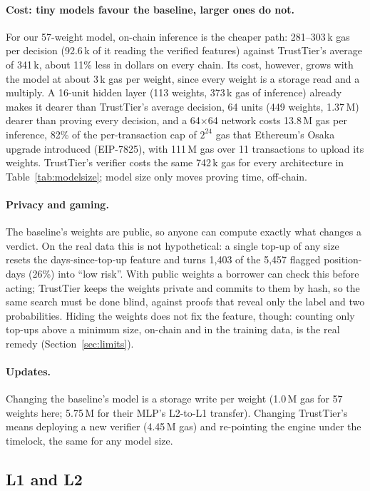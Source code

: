 \documentclass[sigconf,nonacm]{acmart}
\begin{document}
\paragraph{Cost: tiny models favour the baseline, larger ones do not.} For our 57-weight model, on-chain inference is the cheaper path: 281--303\,k gas per decision (92.6\,k of it reading the verified features) against TrustTier's average of 341\,k, about 11\% less in dollars on every chain. Its cost, however, grows with the model at about 3\,k gas per weight, since every weight is a storage read and a multiply. A 16-unit hidden layer (113 weights, 373\,k gas of inference) already makes it dearer than TrustTier's average decision, 64 units (449 weights, 1.37\,M) dearer than proving every decision, and a 64$\times$64 network costs 13.8\,M gas per inference, 82\% of the per-transaction cap of $2^{24}$ gas that Ethereum's Osaka upgrade introduced (EIP-7825), with 111\,M gas over 11 transactions to upload its weights. TrustTier's verifier costs the same 742\,k gas for every architecture in Table~\ref{tab:modelsize}; model size only moves proving time, off-chain.

\paragraph{Privacy and gaming.} The baseline's weights are public, so anyone can compute exactly what changes a verdict. On the real data this is not hypothetical: a single top-up of any size resets the days-since-top-up feature and turns 1,403 of the 5,457 flagged position-days (26\%) into ``low risk''. With public weights a borrower can check this before acting; TrustTier keeps the weights private and commits to them by hash, so the same search must be done blind, against proofs that reveal only the label and two probabilities. Hiding the weights does not fix the feature, though: counting only top-ups above a minimum size, on-chain and in the training data, is the real remedy (Section~\ref{sec:limits}).

\paragraph{Updates.} Changing the baseline's model is a storage write per weight (1.0\,M gas for 57 weights here; 5.75\,M for their MLP's L2-to-L1 transfer). Changing TrustTier's means deploying a new verifier (4.45\,M gas) and re-pointing the engine under the timelock, the same for any model size.

\subsection{L1 and L2}
\label{sec:eval-l2}
\end{document}
